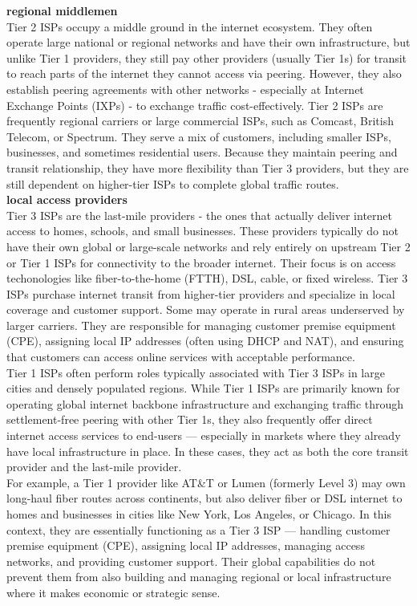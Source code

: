 \documentclass{article}
\begin{document}
\textbf{regional middlemen}\\
Tier 2 ISPs occupy a middle ground in the internet ecosystem. They often operate large national or regional networks and have their own infrastructure, but unlike Tier 1 providers, they still pay other providers (usually Tier 1s) for transit to reach parts of the internet they cannot access via peering. However, they also establish peering agreements with other networks - especially at Internet Exchange Points (IXPs) - to exchange traffic cost-effectively. Tier 2 ISPs are frequently regional carriers or large commercial ISPs, such as Comcast, British Telecom, or Spectrum. They serve a mix of customers, including smaller ISPs, businesses, and sometimes residential users. Because they maintain peering and transit relationship, they have more flexibility than Tier 3 providers, but they are still dependent on higher-tier ISPs to complete global traffic routes.\\

\textbf{local access providers}\\
Tier 3 ISPs are the last-mile providers - the ones that actually deliver internet access to homes, schools, and small businesses. These providers typically do not have their own global or large-scale networks and rely entirely on upstream Tier 2 or Tier 1 ISPs for connectivity to the broader internet. Their focus is on access techonologies like fiber-to-the-home (FTTH), DSL, cable, or fixed wireless. Tier 3 ISPs purchase internet transit from higher-tier providers and specialize in local coverage and customer support. Some may operate in rural areas underserved by larger carriers. They are responsible for managing customer premise equipment (CPE), assigning local IP addresses (often using DHCP and NAT), and ensuring that customers can access online services with acceptable performance.\\

Tier 1 ISPs often perform roles typically associated with Tier 3 ISPs in large cities and densely populated regions. While Tier 1 ISPs are primarily known for operating global internet backbone infrastructure and exchanging traffic through settlement-free peering with other Tier 1s, they also frequently offer direct internet access services to end-users — especially in markets where they already have local infrastructure in place. In these cases, they act as both the core transit provider and the last-mile provider.\\

For example, a Tier 1 provider like AT\&T or Lumen (formerly Level 3) may own long-haul fiber routes across continents, but also deliver fiber or DSL internet to homes and businesses in cities like New York, Los Angeles, or Chicago. In this context, they are essentially functioning as a Tier 3 ISP — handling customer premise equipment (CPE), assigning local IP addresses, managing access networks, and providing customer support. Their global capabilities do not prevent them from also building and managing regional or local infrastructure where it makes economic or strategic sense.\\
\end{document}

